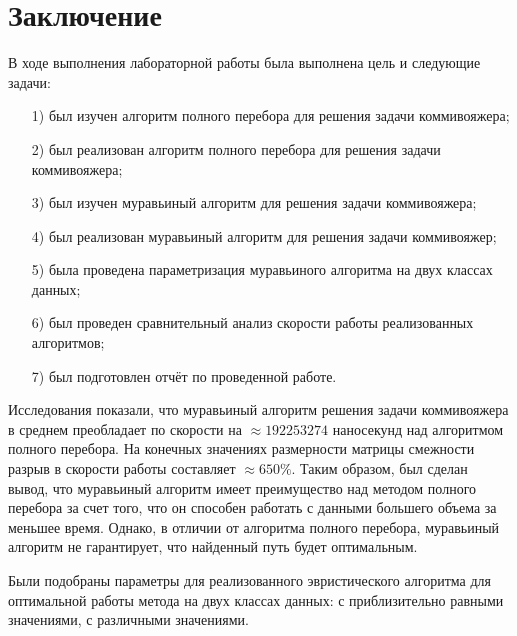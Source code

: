 \documentclass[12pt]{report}
\begin{document}
\chapter*{Заключение}
В ходе выполнения лабораторной работы была выполнена цель и следующие задачи:
\begin{enumerate}
\item[1)] был изучен алгоритм полного перебора для решения задачи коммивояжера;
\item[2)] был реализован алгоритм полного перебора для решения задачи коммивояжера;
\item[3)] был изучен муравьиный алгоритм для решения задачи коммивояжера;
\item[4)] был реализован муравьиный алгоритм для решения задачи коммивояжер;
\item[5)] была проведена параметризация муравьиного алгоритма на двух классах данных;
\item[6)] был проведен сравнительный анализ скорости работы реализованных алгоритмов;
\item[7)] был подготовлен отчёт по проведенной работе.
\end{enumerate}

Исследования показали, что муравьиный алгоритм решения задачи коммивояжера в среднем преобладает по скорости на $\approx 192253274$ наносекунд над алгоритмом полного перебора. На конечных значениях размерности матрицы смежности разрыв в скорости работы составляет $\approx 650\%$.
Таким образом, был сделан вывод, что муравьиный алгоритм имеет преимущество над методом полного перебора за счет того, что он способен работать с данными большего объема за меньшее время. Однако, в отличии от алгоритма полного перебора, муравьиный алгоритм не гарантирует, что найденный путь будет оптимальным.

Были подобраны параметры для реализованного эвристического алгоритма для оптимальной работы метода на двух классах данных: с приблизительно равными значениями, с различными значениями.

\end{document}
